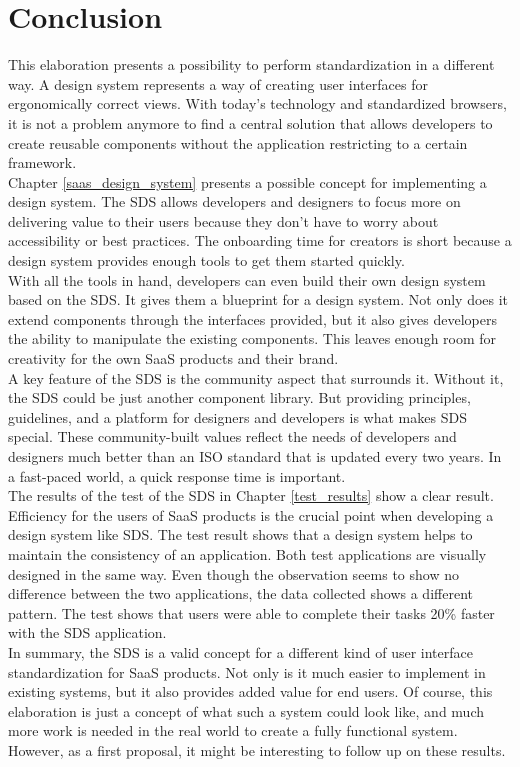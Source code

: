 \newpage
\section{Conclusion}
This elaboration presents a possibility to perform standardization in a different way. A design system represents a way of creating user interfaces for ergonomically correct views. With today's technology and standardized browsers, it is not a problem anymore to find a central solution that allows developers to create reusable components without the application restricting to a certain framework. \\
Chapter \ref{saas_design_system} presents a possible concept for implementing a design system. The \acl{SDS} allows developers and designers to focus more on delivering value to their users because they don't have to worry about accessibility or best practices. The onboarding time for creators is short because a design system provides enough tools to get them started quickly. \\
With all the tools in hand, developers can even build their own design system based on the \ac{SDS}. It gives them a blueprint for a design system. Not only does it extend components through the interfaces provided, but it also gives developers the ability to manipulate the existing components. This leaves enough room for creativity for the own \ac{SaaS} products and their brand.\\
A key feature of the \ac{SDS} is the community aspect that surrounds it. Without it, the \ac{SDS} could be just another component library. But providing principles, guidelines, and a platform for designers and developers is what makes \ac{SDS} special. These community-built values reflect the needs of developers and designers much better than an ISO standard that is updated every two years. In a fast-paced world, a quick response time is important.\\
The results of the test of the \ac{SDS} in Chapter \ref{test_results} show a clear result. Efficiency for the users of \ac{SaaS} products is the crucial point when developing a design system like \ac{SDS}. The test result shows that a design system helps to maintain the consistency of an application. Both test applications are visually designed in the same way. Even though the observation seems to show no difference between the two applications, the data collected shows a different pattern. The test shows that users were able to complete their tasks 20\% faster with the \ac{SDS} application. \\
In summary, the \ac{SDS} is a valid concept for a different kind of user interface standardization for \ac{SaaS} products. Not only is it much easier to implement in existing systems, but it also provides added value for end users. Of course, this elaboration is just a concept of what such a system could look like, and much more work is needed in the real world to create a fully functional system. However, as a first proposal, it might be interesting to follow up on these results.
